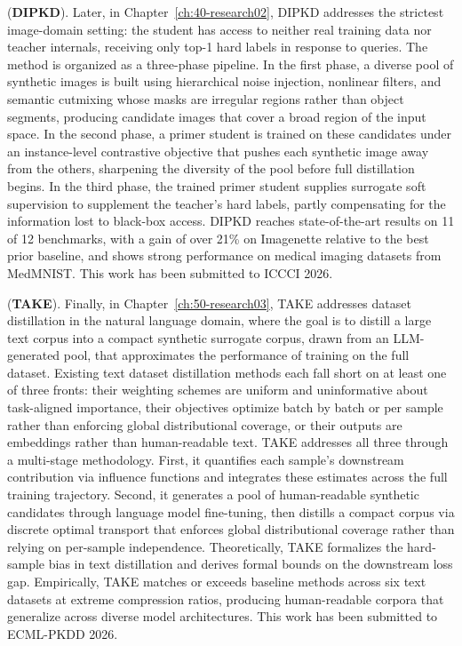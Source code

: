 \begin{foldable}
   (\textbf{\acs{DIPKD}}).
  Later, in Chapter~\ref{ch:40-research02}, \ac{DIPKD} addresses the strictest image-domain setting: the student has access to neither real training data nor teacher internals, receiving only top-1 hard labels in response to queries.
  The method is organized as a three-phase pipeline.
  In the first phase, a diverse pool of synthetic images is built using hierarchical noise injection, nonlinear filters, and semantic cutmixing whose masks are irregular regions rather than object segments, producing candidate images that cover a broad region of the input space.
  In the second phase, a primer student is trained on these candidates under an instance-level contrastive objective that pushes each synthetic image away from the others, sharpening the diversity of the pool before full distillation begins.
  In the third phase, the trained primer student supplies surrogate soft supervision to supplement the teacher's hard labels, partly compensating for the information lost to black-box access.
  \ac{DIPKD} reaches state-of-the-art results on 11 of 12 benchmarks, with a gain of over 21\% on Imagenette relative to the best prior baseline, and shows strong performance on medical imaging datasets from MedMNIST.
  This work has been submitted to ICCCI 2026.
\end{foldable}

\begin{foldable}
   (\textbf{\acs{TAKE}}).
  Finally, in Chapter~\ref{ch:50-research03}, \ac{TAKE} addresses dataset distillation in the natural language domain, where the goal is to distill a large text corpus into a compact synthetic surrogate corpus, drawn from an LLM-generated pool, that approximates the performance of training on the full dataset.
  Existing text dataset distillation methods each fall short on at least one of three fronts: their weighting schemes are uniform and uninformative about task-aligned importance, their objectives optimize batch by batch or per sample rather than enforcing global distributional coverage, or their outputs are embeddings rather than human-readable text.
  \ac{TAKE} addresses all three through a multi-stage methodology.
  First, it quantifies each sample's downstream contribution via influence functions and integrates these estimates across the full training trajectory.
  Second, it generates a pool of human-readable synthetic candidates through language model fine-tuning, then distills a compact corpus via discrete optimal transport that enforces global distributional coverage rather than relying on per-sample independence.
  Theoretically, \ac{TAKE} formalizes the hard-sample bias in text distillation and derives formal bounds on the downstream loss gap.
  Empirically, \ac{TAKE} matches or exceeds baseline methods across six text datasets at extreme compression ratios, producing human-readable corpora that generalize across diverse model architectures.
  This work has been submitted to ECML-PKDD 2026.
\end{foldable}

